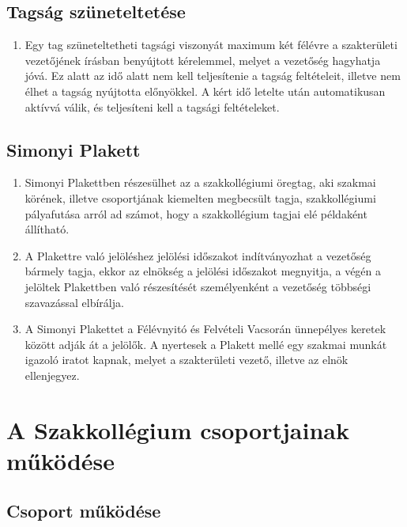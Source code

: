 \documentclass[12pt]{report}
\begin{document}
\section{Tagság szüneteltetése}

\begin{enumerate}
  \item Egy tag szüneteltetheti tagsági viszonyát maximum két félévre a szakterületi vezetőjének írásban benyújtott kérelemmel, melyet a vezetőség hagyhatja jóvá. 
    Ez alatt az idő alatt nem kell teljesítenie a tagság feltételeit, illetve nem élhet a tagság nyújtotta előnyökkel. A kért idő letelte után automatikusan aktívvá válik, 
    és teljesíteni kell a tagsági feltételeket.
\end{enumerate}

\section{Simonyi Plakett}

\begin{enumerate}
  \item Simonyi Plakettben részesülhet az a szakkollégiumi öregtag, aki szakmai körének, illetve csoportjának kiemelten megbecsült tagja, szakkollégiumi pályafutása arról ad számot, 
    hogy a szakkollégium tagjai elé példaként állítható.
  \item A Plakettre való jelöléshez jelölési időszakot indítványozhat a vezetőség bármely tagja, ekkor az elnökség a jelölési időszakot megnyitja, a végén a jelöltek Plakettben való 
    részesítését személyenként a vezetőség többségi szavazással elbírálja.
  \item A Simonyi Plakettet a Félévnyitó és Felvételi Vacsorán ünnepélyes keretek között adják át a jelölők. A nyertesek a Plakett mellé egy szakmai munkát igazoló iratot kapnak, 
    melyet a szakterületi vezető, illetve az elnök ellenjegyez.
\end{enumerate}


\chapter{A Szakkollégium csoportjainak működése} \label{annex_groups}

\section{Csoport működése}
\end{document}
